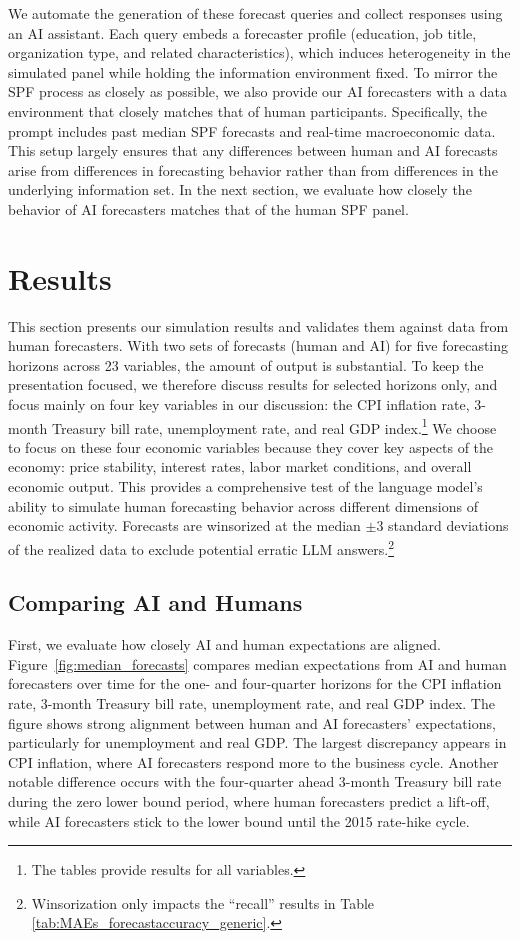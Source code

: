 \documentclass[11pt,letterpaper]{scrartcl}
\begin{document}
We automate the generation of these forecast queries and collect responses using an AI assistant. Each query embeds a forecaster profile (education, job title, organization type, and related characteristics), which induces heterogeneity in the simulated panel while holding the information environment fixed. To mirror the SPF process as closely as possible, we also provide our AI forecasters with a data environment that closely matches that of human participants. Specifically, the prompt includes past median SPF forecasts and real-time macroeconomic data. This setup largely ensures that any differences between human and AI forecasts arise from differences in forecasting behavior rather than from differences in the underlying information set. In the next section, we evaluate how closely the behavior of AI forecasters matches that of the human SPF panel.

\section{Results}\label{sec:all_results}

This section presents our simulation results and validates them against data from human forecasters. With two sets of forecasts (human and AI) for five forecasting horizons across 23 variables, the amount of output is substantial. To keep the presentation focused, we therefore discuss results for selected horizons only, and focus mainly on four key variables in our discussion: the CPI inflation rate, 3-month Treasury bill rate, unemployment rate, and real GDP index.\footnote{The tables provide results for all variables.} We choose to focus on these four economic variables because they cover key aspects of the economy: price stability, interest rates, labor market conditions, and overall economic output. This provides a comprehensive test of the language model's ability to simulate human forecasting behavior across different dimensions of economic activity. Forecasts are winsorized at the median $\pm3$ standard deviations of the realized data to exclude potential erratic LLM answers.\footnote{Winsorization only impacts the ``recall'' results in Table \ref{tab:MAEs_forecastaccuracy_generic}.}

\subsection{Comparing AI and Humans}\label{sec:results_replication}

First, we evaluate how closely AI and human expectations are aligned. Figure~\ref{fig:median_forecasts} compares median expectations from AI and human forecasters over time for the one- and four-quarter horizons for the CPI inflation rate, 3-month Treasury bill rate, unemployment rate, and real GDP index. The figure shows strong alignment between human and AI forecasters' expectations, particularly for unemployment and real GDP. The largest discrepancy appears in CPI inflation, where AI forecasters respond more to the business cycle. Another notable difference occurs with the four-quarter ahead 3-month Treasury bill rate during the zero lower bound period, where human forecasters predict a lift-off, while AI forecasters stick to the lower bound until the 2015 rate-hike cycle. 
\end{document}
